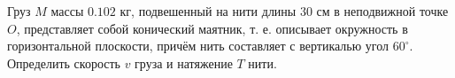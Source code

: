 Груз $M$ массы $0.102$ кг, подвешенный на нити длины $30$ см
в неподвижной точке $O$, представляет собой конический маятник,
т. е. описывает окружность в горизонтальной плоскости,
причём нить составляет с вертикалью угол $60^{\circ}$.
Определить скорость $v$ груза и натяжение $T$ нити.
